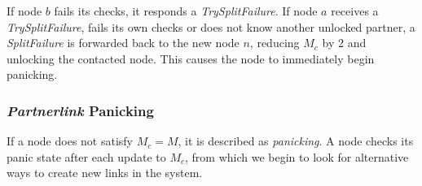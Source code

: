 \documentclass[12pt,a4paper]{article}
\begin{document}
If node \(b\) fails its checks, it responds a \textit{TrySplitFailure}. If node \(a\) receives a \textit{TrySplitFailure}, fails its own checks or does not know another unlocked partner, a \textit{SplitFailure} is forwarded back to the new node \(n\), reducing \(M_c\) by 2 and unlocking the contacted node. This causes the node to immediately begin panicking.

\subsubsection{\textit{Partnerlink} Panicking} \label{css:partnerlink:panicking}
If a node does not satisfy \(M_c = M\), it is described as \textit{panicking}. A node checks its panic state after each update to \(M_c\), from which we begin to look for alternative ways to create new links in the system.
\end{document}
